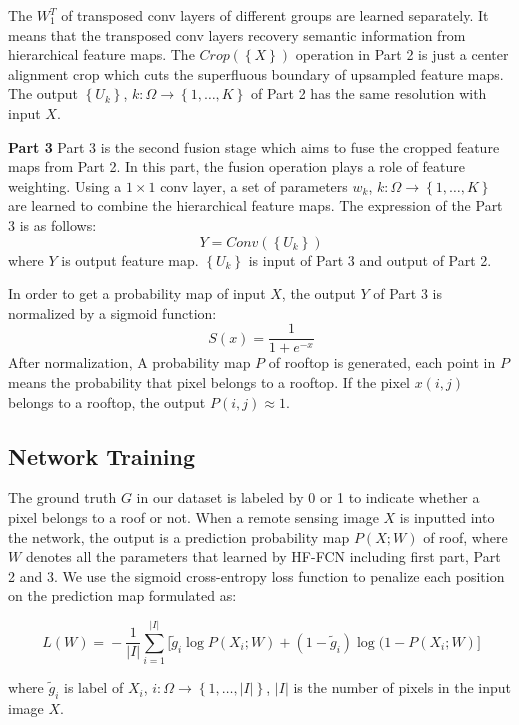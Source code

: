 The ${W_1^T}$ of transposed conv layers of different groups are learned separately. It means that the transposed conv layers recovery semantic information from hierarchical feature maps.
The ${Crop(\left\{X \right\})}$ operation in Part 2 is just a center alignment crop which cuts the superfluous boundary of upsampled feature maps. The output ${\left\{U_k\right\}}$, ${k:\Omega \to\left\{1,\ldots,K\right\}}$ of Part 2 has the same resolution with input ${X}$.


\textbf{Part 3} Part 3 is the second fusion stage which aims to fuse the cropped feature maps from Part 2.
In this part, the fusion operation plays a role of feature weighting.
Using a ${1\times1}$ conv layer, a set of parameters ${w_k}$, ${k:\Omega \to\left\{1,\ldots,K\right\}}$ are learned to combine the hierarchical feature maps.
The expression of the Part 3 is as follows:
\begin{equation}
    \label{fature_selection}
    \ Y= Conv(\left\{U_k\right\})
\end{equation}
where ${Y}$ is output feature map. ${\left\{U_k\right\}}$ is input of Part 3 and output of Part 2.


In order to get a probability map of input ${X}$, the output ${Y}$ of Part 3 is normalized by a sigmoid function:
\begin{equation}
    \label{Sigmoid}
    \ S(x) = \frac{1}{1+e^{-x}}
\end{equation}
After normalization, A probability map ${P}$ of rooftop is generated, each point in ${P}$ means the probability that pixel belongs to a rooftop.
If the pixel ${x(i,j)}$ belongs to a rooftop, the output ${P(i,j)\approx1}$.

\subsection{Network Training}

The ground truth $G$ in our dataset is labeled by 0 or 1 to indicate whether a pixel belongs to a roof or not. 
When a remote sensing image ${X}$ is inputted into the network, the output is a prediction probability map $P(X;W)$ of roof, where $W$ denotes all the parameters that learned by HF-FCN including first part, Part 2 and 3.
We use the sigmoid cross-entropy loss function to penalize each position on the prediction map formulated as:
\begin{small}
\begin{equation}
     \label{loss}
     \ L(W)\! =\! -\frac{1}{\vert I\vert}\sum_{i=1}^{\vert I \vert}\lbrack{\tilde{g}_i \log{P(X_{i};W)}\!+\!(1\!-\!\tilde{g}_i)\log(1\!-\!P(X_{i};W)}\rbrack
\end{equation}
\end{small}
where $\tilde{g}_i$ is label of $X_{i}$, ${i:\Omega \to\left\{1,\ldots,\vert I\vert\right\}}$, ${\vert I\vert}$ is the number of pixels in the input image ${X}$.
